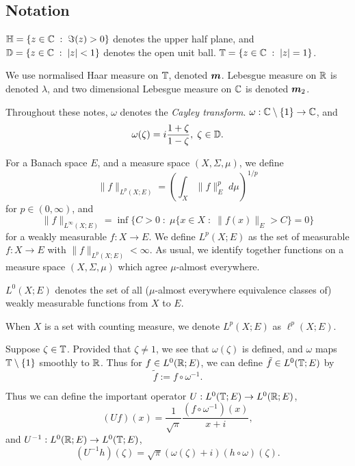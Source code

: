 \subsection{Notation}
$\mathbb{H} = \{z \in \mathbb{C}\;:\;\Im(z) > 0\}$ denotes the upper half plane,
and $\mathbb{D} = \{z\in \mathbb{C}\;:\; |z| < 1\}$ denotes the open unit ball.
$\mathbb{T} = \{z \in \mathbb{C}\;:\; |z| = 1\}$.

We use normalised Haar measure on $\mathbb{T}$, denoted $\boldsymbol{m}$. Lebesgue
measure on $\mathbb{R}$ is denoted $\lambda$, and two dimensional Lebesgue measure on
$\mathbb{C}$ is denoted $\boldsymbol{m}_2$.

Throughout these notes, $\omega$ denotes the \emph{Cayley transform}.
$\omega:\mathbb{C}\setminus\{1\}\rightarrow \mathbb{C}$, and 
\begin{equation}
    \omega(\zeta) = i\frac{1+\zeta}{1-\zeta},\;\zeta \in \mathbb{D}.
\end{equation}

For a Banach space $E$, and a measure space $(X,\Sigma,\mu)$, we define
\begin{equation}
    \|f\|_{L^p(X;E)} = \left(\int_X \|f\|_E^p \;d\mu\right)^{1/p}
\end{equation}
for $p \in (0,\infty)$, and
\begin{equation}
    \|f\|_{L^\infty(X;E)} = \inf\{C > 0 \;:\; \mu\{x \in X \;:\; \|f(x)\|_E > C\} = 0\}
\end{equation}
for a weakly measurable $f:X\rightarrow E$. We define $L^p(X;E)$ as the set
of measurable $f:X\rightarrow E$ with $\|f\|_{L^p(X;E)} < \infty$. As usual, 
we identify together functions on a measure space $(X,\Sigma,\mu)$ 
which agree $\mu$-almost everywhere.

$L^0(X;E)$ denotes the set of all ($\mu$-almost everywhere equivalence classes of)
weakly measurable functions from $X$ to $E$.

When $X$ is a set with counting measure, we denote $L^p(X;E)$ as $\ell^p(X;E)$.

Suppose $\zeta \in \mathbb{T}$. Provided that $\zeta \neq 1$, we see that $\omega(\zeta)$
is defined, and $\omega$ maps $\mathbb{T}\setminus\{1\}$ smoothly to $\mathbb{R}$. Thus for
$f \in L^0(\mathbb{R};E)$, we can define $\tilde{f} \in L^0(\mathbb{T};E)$
by 
\begin{equation}
    \tilde{f} := f\circ \omega^{-1}.
\end{equation}

Thus we can define the important operator $U:L^0(\mathbb{T};E)\rightarrow L^0(\mathbb{R};E)$,
\begin{equation}
\label{cayleyTransform}
    (U f)(x) = \frac{1}{\sqrt{\pi}}\frac{(f\circ \omega^{-1})(x)}{x+i},
\end{equation}
and $U^{-1}:L^0(\mathbb{R};E)\to L^0(\mathbb{T};E)$,
\begin{equation}
        (U^{-1}h)(\zeta) = \sqrt{\pi}(\omega(\zeta)+i)(h\circ\omega)(\zeta).
\end{equation}

